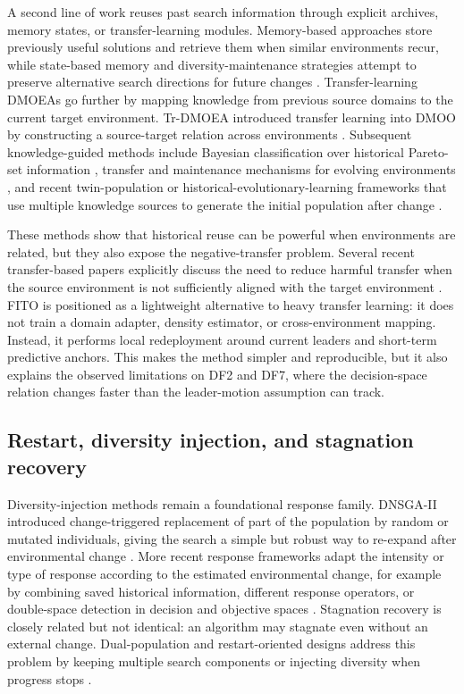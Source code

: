 \documentclass[preprint,12pt]{elsarticle}
\begin{document}
A second line of work reuses past search information through explicit archives, memory states, or transfer-learning modules. Memory-based approaches store previously useful solutions and retrieve them when similar environments recur, while state-based memory and diversity-maintenance strategies attempt to preserve alternative search directions for future changes \cite{Zou2021Stagnation}. Transfer-learning DMOEAs go further by mapping knowledge from previous source domains to the current target environment. Tr-DMOEA introduced transfer learning into DMOO by constructing a source-target relation across environments \cite{Jiang2018TrDMOEA}. Subsequent knowledge-guided methods include Bayesian classification over historical Pareto-set information \cite{Ye2022KGB}, transfer and maintenance mechanisms for evolving environments \cite{Lin2024KTMO}, and recent twin-population or historical-evolutionary-learning frameworks that use multiple knowledge sources to generate the initial population after change \cite{Zhao2025TMKT,Guan2026EHEL}.

These methods show that historical reuse can be powerful when environments are related, but they also expose the negative-transfer problem. Several recent transfer-based papers explicitly discuss the need to reduce harmful transfer when the source environment is not sufficiently aligned with the target environment \cite{Jiang2018TrDMOEA,Li2025DST}. FITO is positioned as a lightweight alternative to heavy transfer learning: it does not train a domain adapter, density estimator, or cross-environment mapping. Instead, it performs local redeployment around current leaders and short-term predictive anchors. This makes the method simpler and reproducible, but it also explains the observed limitations on DF2 and DF7, where the decision-space relation changes faster than the leader-motion assumption can track.

\subsection{Restart, diversity injection, and stagnation recovery}

Diversity-injection methods remain a foundational response family. DNSGA-II introduced change-triggered replacement of part of the population by random or mutated individuals, giving the search a simple but robust way to re-expand after environmental change \cite{Deb2007DNSGAII}. More recent response frameworks adapt the intensity or type of response according to the estimated environmental change, for example by combining saved historical information, different response operators, or double-space detection in decision and objective spaces \cite{Hu2024HSS,Ma2024DSDRS,Li2024RSAS}. Stagnation recovery is closely related but not identical: an algorithm may stagnate even without an external change. Dual-population and restart-oriented designs address this problem by keeping multiple search components or injecting diversity when progress stops \cite{Li2022Restart}.
\end{document}
